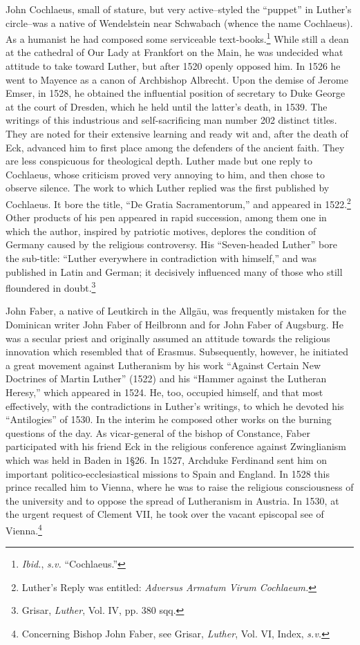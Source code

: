 John Cochlaeus, small of stature, but very active--styled the “puppet”
in Luther’s circle--was a native of Wendelstein near Schwabach
(whence the name Cochlaeus). As a humanist he had composed some
serviceable text-books.\footnote{\textit{Ibid.}, \textit{s.v.} “Cochlaeus.”}
While still a dean at the cathedral of Our
Lady at Frankfort on the Main, he was undecided what attitude to
take toward Luther, but after 1520 openly opposed him. In 1526 he
went to Mayence as a canon of Archbishop Albrecht. Upon the
demise of Jerome Emser, in 1528, he obtained the influential position
of secretary to Duke George at the court of Dresden, which he held
until the latter’s death, in 1539. The writings of this industrious and
self-sacrificing man number 202 distinct titles. They are noted for
their extensive learning and ready wit and, after the death of Eck,
advanced him to first place among the defenders of the ancient faith.
They are less conspicuous for theological depth. Luther made but one
reply to Cochlaeus, whose criticism proved very annoying to him,
and then chose to observe silence. The work to which Luther replied
was the first published by Cochlaeus. It bore the title, “De Gratia
Sacramentorum,” and appeared in 1522.\footnote
{Luther’s Reply was entitled: \textit{Adversus Armatum Virum Cochlaeum.}}
Other products of his pen
appeared in rapid succession, among them one in which the author,
inspired by patriotic motives, deplores the condition of Germany
caused by the religious controversy. His “Seven-headed Luther” bore
the sub-title: “Luther everywhere in contradiction with himself,”
and was published in Latin and German; it decisively influenced many
of those who still floundered in doubt.\footnote
{Grisar, \textit{Luther}, Vol. IV, pp. 380 sqq.}

John Faber, a native of Leutkirch in the Allgäu, was frequently
mistaken for the Dominican writer John Faber of Heilbronn and
for John Faber of Augsburg. He was a secular priest and originally
assumed an attitude towards the religious innovation which resembled
that of Erasmus. Subsequently, however, he initiated a great movement against
Lutheranism by his work “Against Certain New Doctrines of Martin Luther”
(1522) and his “Hammer against the Lutheran Heresy,” which appeared in
1524. He, too, occupied himself,
and that most effectively, with the contradictions in Luther’s writings,
to which he devoted his “Antilogies” of 1530. In the interim he composed
other works on the burning questions of the day. As vicar-general of the
bishop of Constance, Faber participated with his friend
Eck in the religious conference against Zwinglianism which was held
in Baden in 1§26. In 1527, Archduke Ferdinand sent him on important politico-ecclesiastical
missions to Spain and England. In 1528
this prince recalled him to Vienna, where he was to raise the religious
consciousness of the university and to oppose the spread of Lutheranism
in Austria. In 1530, at the urgent request of Clement VII, he
took over the vacant episcopal see of Vienna.\footnote
{Concerning Bishop John Faber, see Grisar, \textit{Luther}, Vol. VI, Index, \textit{s.v.}}

